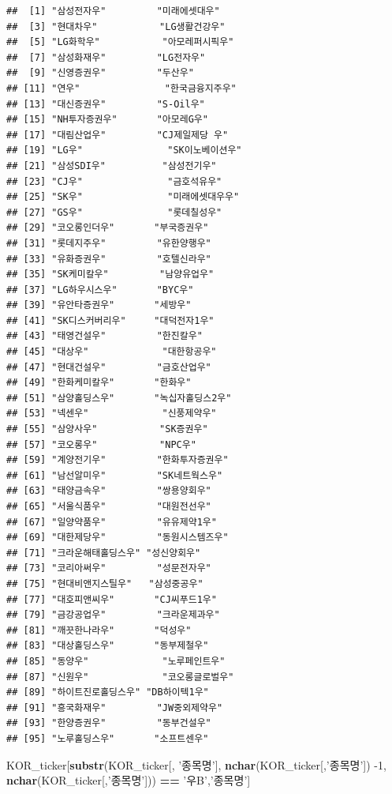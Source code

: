 \documentclass[12pt,]{book}
\newenvironment{Shaded}{\begin{snugshade}}{\end{snugshade}}
\newcommand{\DecValTok}[1]{\textcolor[rgb]{0.00,0.00,0.81}{#1}}
\newcommand{\KeywordTok}[1]{\textcolor[rgb]{0.13,0.29,0.53}{\textbf{#1}}}
\newcommand{\NormalTok}[1]{#1}
\newcommand{\OperatorTok}[1]{\textcolor[rgb]{0.81,0.36,0.00}{\textbf{#1}}}
\newcommand{\StringTok}[1]{\textcolor[rgb]{0.31,0.60,0.02}{#1}}
\begin{document}
\begin{verbatim}
##  [1] "삼성전자우"         "미래에셋대우"      
##  [3] "현대차우"           "LG생활건강우"      
##  [5] "LG화학우"           "아모레퍼시픽우"    
##  [7] "삼성화재우"         "LG전자우"          
##  [9] "신영증권우"         "두산우"            
## [11] "연우"               "한국금융지주우"    
## [13] "대신증권우"         "S-Oil우"           
## [15] "NH투자증권우"       "아모레G우"         
## [17] "대림산업우"         "CJ제일제당 우"     
## [19] "LG우"               "SK이노베이션우"    
## [21] "삼성SDI우"          "삼성전기우"        
## [23] "CJ우"               "금호석유우"        
## [25] "SK우"               "미래에셋대우우"    
## [27] "GS우"               "롯데칠성우"        
## [29] "코오롱인더우"       "부국증권우"        
## [31] "롯데지주우"         "유한양행우"        
## [33] "유화증권우"         "호텔신라우"        
## [35] "SK케미칼우"         "남양유업우"        
## [37] "LG하우시스우"       "BYC우"             
## [39] "유안타증권우"       "세방우"            
## [41] "SK디스커버리우"     "대덕전자1우"       
## [43] "태영건설우"         "한진칼우"          
## [45] "대상우"             "대한항공우"        
## [47] "현대건설우"         "금호산업우"        
## [49] "한화케미칼우"       "한화우"            
## [51] "삼양홀딩스우"       "녹십자홀딩스2우"   
## [53] "넥센우"             "신풍제약우"        
## [55] "삼양사우"           "SK증권우"          
## [57] "코오롱우"           "NPC우"             
## [59] "계양전기우"         "한화투자증권우"    
## [61] "남선알미우"         "SK네트웍스우"      
## [63] "태양금속우"         "쌍용양회우"        
## [65] "서울식품우"         "대원전선우"        
## [67] "일양약품우"         "유유제약1우"       
## [69] "대한제당우"         "동원시스템즈우"    
## [71] "크라운해태홀딩스우" "성신양회우"        
## [73] "코리아써우"         "성문전자우"        
## [75] "현대비앤지스틸우"   "삼성중공우"        
## [77] "대호피앤씨우"       "CJ씨푸드1우"       
## [79] "금강공업우"         "크라운제과우"      
## [81] "깨끗한나라우"       "덕성우"            
## [83] "대상홀딩스우"       "동부제철우"        
## [85] "동양우"             "노루페인트우"      
## [87] "신원우"             "코오롱글로벌우"    
## [89] "하이트진로홀딩스우" "DB하이텍1우"       
## [91] "흥국화재우"         "JW중외제약우"      
## [93] "한양증권우"         "동부건설우"        
## [95] "노루홀딩스우"       "소프트센우"
\end{verbatim}

\begin{Shaded}
\begin{Highlighting}[]
\NormalTok{KOR_ticker[}\KeywordTok{substr}\NormalTok{(KOR_ticker[, }\StringTok{'종목명'}\NormalTok{],}
                  \KeywordTok{nchar}\NormalTok{(KOR_ticker[,}\StringTok{'종목명'}\NormalTok{]) }\DecValTok{-1}\NormalTok{,}
                  \KeywordTok{nchar}\NormalTok{(KOR_ticker[,}\StringTok{'종목명'}\NormalTok{])) }\OperatorTok{==}\StringTok{ '우B'}\NormalTok{,}\StringTok{'종목명'}\NormalTok{] }
\end{Highlighting}
\end{Shaded}
\end{document}
